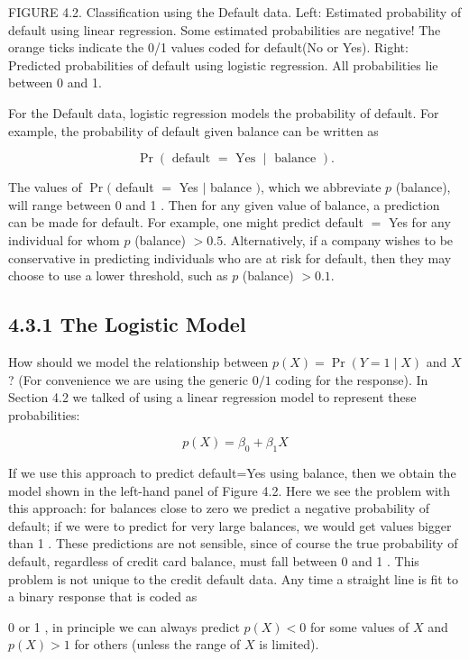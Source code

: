\documentclass[10pt]{article}
\begin{document}
FIGURE 4.2. Classification using the Default data. Left: Estimated probability of default using linear regression. Some estimated probabilities are negative! The orange ticks indicate the 0/1 values coded for default(No or Yes). Right: Predicted probabilities of default using logistic regression. All probabilities lie between 0 and 1.

For the Default data, logistic regression models the probability of default. For example, the probability of default given balance can be written as

$$
\operatorname{Pr}(\text { default }=\text { Yes } \mid \text { balance }) .
$$

The values of $\operatorname{Pr}($ default $=$ Yes $\mid$ balance $)$, which we abbreviate $p$ (balance), will range between 0 and 1 . Then for any given value of balance, a prediction can be made for default. For example, one might predict default $=$ Yes for any individual for whom $p$ (balance) $>0.5$. Alternatively, if a company wishes to be conservative in predicting individuals who are at risk for default, then they may choose to use a lower threshold, such as $p$ (balance) $>0.1$.

\subsection*{4.3.1 The Logistic Model}
How should we model the relationship between $p(X)=\operatorname{Pr}(Y=1 \mid X)$ and $X$ ? (For convenience we are using the generic $0 / 1$ coding for the response). In Section 4.2 we talked of using a linear regression model to represent these probabilities:


\begin{equation*}
p(X)=\beta_{0}+\beta_{1} X \tag{4.1}
\end{equation*}


If we use this approach to predict default=Yes using balance, then we obtain the model shown in the left-hand panel of Figure 4.2. Here we see the problem with this approach: for balances close to zero we predict a negative probability of default; if we were to predict for very large balances, we would get values bigger than 1 . These predictions are not sensible, since of course the true probability of default, regardless of credit card balance, must fall between 0 and 1 . This problem is not unique to the credit default data. Any time a straight line is fit to a binary response that is coded as

0 or 1 , in principle we can always predict $p(X)<0$ for some values of $X$ and $p(X)>1$ for others (unless the range of $X$ is limited).
\end{document}
